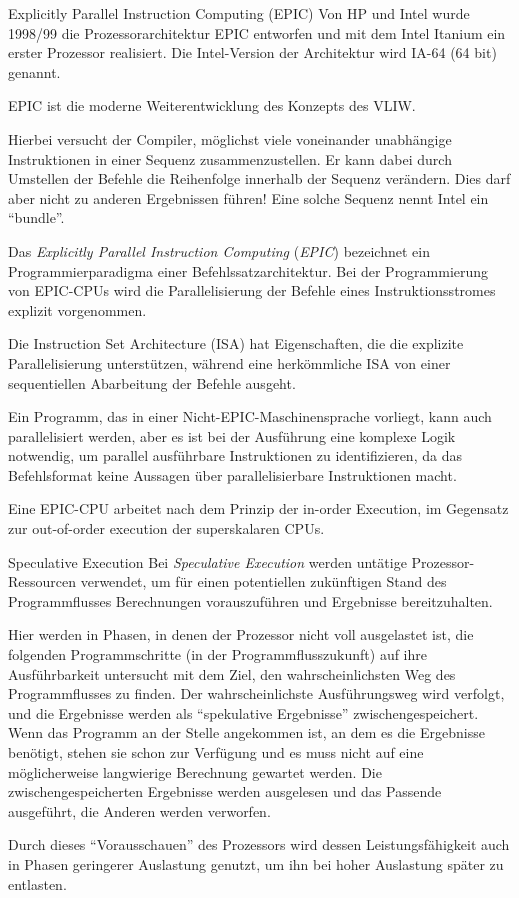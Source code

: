 \begin{defi}[Befehlssatzarchitektur]{Explicitly Parallel Instruction Computing (EPIC)}
    Von HP und Intel wurde 1998/99 die Prozessorarchitektur EPIC entworfen und mit dem Intel Itanium ein erster Prozessor realisiert. 
    Die Intel-Version der Architektur wird IA-64 (64 bit) genannt.
    
    EPIC ist die moderne Weiterentwicklung des Konzepts des VLIW.
    
    Hierbei versucht der Compiler, möglichst viele voneinander unabhängige Instruktionen in einer Sequenz zusammenzustellen. 
    Er kann dabei durch Umstellen der Befehle die Reihenfolge innerhalb der Sequenz verändern. Dies darf aber nicht zu anderen Ergebnissen führen!
    Eine solche Sequenz nennt Intel ein \enquote{bundle}.
    
    Das \emph{Explicitly Parallel Instruction Computing} (\emph{EPIC}) bezeichnet ein Programmierparadigma einer Befehlssatzarchitektur.
    Bei der Programmierung von EPIC-CPUs wird die Parallelisierung der Befehle eines Instruktionsstromes explizit vorgenommen.
    
    Die Instruction Set Architecture (ISA) hat Eigenschaften, die die explizite Parallelisierung unterstützen, während eine herkömmliche ISA von einer sequentiellen Abarbeitung der Befehle ausgeht.
    
    Ein Programm, das in einer Nicht-EPIC-Maschinensprache vorliegt, kann auch parallelisiert werden, aber es ist bei der Ausführung eine komplexe Logik notwendig, um parallel ausführbare Instruktionen zu identifizieren, da das Befehlsformat keine Aussagen über parallelisierbare Instruktionen macht.
    
    Eine EPIC-CPU arbeitet nach dem Prinzip der in-order Execution, im Gegensatz zur out-of-order execution der superskalaren CPUs.
\end{defi}

\begin{defi}{Speculative Execution}
    Bei \emph{Speculative Execution} werden untätige Prozessor-Ressourcen verwendet, um für einen potentiellen zukünftigen Stand des Programmflusses Berechnungen vorauszuführen und Ergebnisse bereitzuhalten.
    
    Hier werden in Phasen, in denen der Prozessor nicht voll ausgelastet ist, die folgenden Programmschritte (in der Programmflusszukunft) auf ihre Ausführbarkeit untersucht mit dem Ziel, den wahrscheinlichsten Weg des Programmflusses zu finden.
    Der wahrscheinlichste Ausführungsweg wird verfolgt, und die Ergebnisse werden als \enquote{spekulative Ergebnisse} zwischengespeichert.
    Wenn das Programm an der Stelle angekommen ist, an dem es die Ergebnisse benötigt, stehen sie schon zur Verfügung und es muss nicht auf eine möglicherweise langwierige Berechnung gewartet werden.
    Die zwischengespeicherten Ergebnisse werden ausgelesen und das Passende ausgeführt, die Anderen werden verworfen.
    
    Durch dieses \enquote{Vorausschauen} des Prozessors wird dessen Leistungsfähigkeit auch in Phasen geringerer Auslastung genutzt, um ihn bei hoher Auslastung später zu entlasten.
\end{defi}

